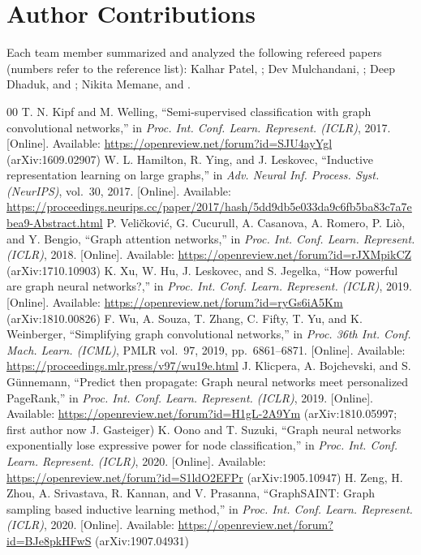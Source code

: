 \documentclass[conference]{IEEEtran}
\begin{document}
\section*{Author Contributions}

Each team member summarized and analyzed the following refereed papers (numbers refer to the reference list): Kalhar Patel, \cite{b1,b2,b3}; Dev Mulchandani, \cite{b4,b5,b6}; Deep Dhaduk, \cite{b7} and \cite{b8}; Nikita Memane, \cite{b9} and \cite{b10}.

\begin{thebibliography}{00}
 T. N. Kipf and M. Welling, ``Semi-supervised classification with graph convolutional networks,'' in \emph{Proc. Int. Conf. Learn. Represent. (ICLR)}, 2017. {[}Online{]}. Available: \url{https://openreview.net/forum?id=SJU4ayYgl} (arXiv:1609.02907)
 W. L. Hamilton, R. Ying, and J. Leskovec, ``Inductive representation learning on large graphs,'' in \emph{Adv. Neural Inf. Process. Syst. (NeurIPS)}, vol.~30, 2017. {[}Online{]}. Available: \url{https://proceedings.neurips.cc/paper/2017/hash/5dd9db5e033da9c6fb5ba83c7a7ebea9-Abstract.html}
 P. Veličković, G. Cucurull, A. Casanova, A. Romero, P. Liò, and Y. Bengio, ``Graph attention networks,'' in \emph{Proc. Int. Conf. Learn. Represent. (ICLR)}, 2018. {[}Online{]}. Available: \url{https://openreview.net/forum?id=rJXMpikCZ} (arXiv:1710.10903)
 K. Xu, W. Hu, J. Leskovec, and S. Jegelka, ``How powerful are graph neural networks?,'' in \emph{Proc. Int. Conf. Learn. Represent. (ICLR)}, 2019. {[}Online{]}. Available: \url{https://openreview.net/forum?id=ryGs6iA5Km} (arXiv:1810.00826)
 F. Wu, A. Souza, T. Zhang, C. Fifty, T. Yu, and K. Weinberger, ``Simplifying graph convolutional networks,'' in \emph{Proc. 36th Int. Conf. Mach. Learn. (ICML)}, PMLR vol.~97, 2019, pp.~6861--6871. {[}Online{]}. Available: \url{https://proceedings.mlr.press/v97/wu19e.html}
 J. Klicpera, A. Bojchevski, and S. Günnemann, ``Predict then propagate: Graph neural networks meet personalized PageRank,'' in \emph{Proc. Int. Conf. Learn. Represent. (ICLR)}, 2019. {[}Online{]}. Available: \url{https://openreview.net/forum?id=H1gL-2A9Ym} (arXiv:1810.05997; first author now J. Gasteiger)
 K. Oono and T. Suzuki, ``Graph neural networks exponentially lose expressive power for node classification,'' in \emph{Proc. Int. Conf. Learn. Represent. (ICLR)}, 2020. {[}Online{]}. Available: \url{https://openreview.net/forum?id=S1ldO2EFPr} (arXiv:1905.10947)
 H. Zeng, H. Zhou, A. Srivastava, R. Kannan, and V. Prasanna, ``GraphSAINT: Graph sampling based inductive learning method,'' in \emph{Proc. Int. Conf. Learn. Represent. (ICLR)}, 2020. {[}Online{]}. Available: \url{https://openreview.net/forum?id=BJe8pkHFwS} (arXiv:1907.04931)

\end{thebibliography}
\end{document}
